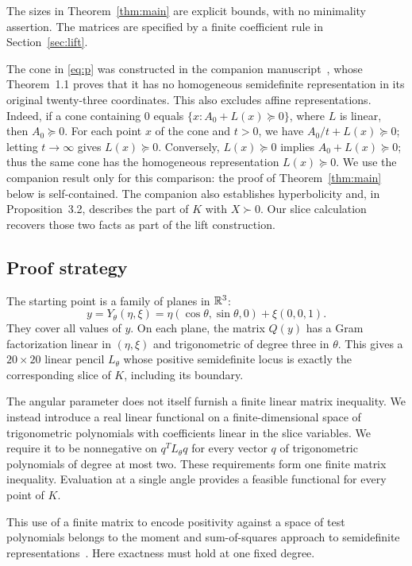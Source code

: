 The sizes in Theorem~\ref{thm:main} are explicit bounds, with no
minimality assertion. The matrices are specified by a finite
coefficient rule in Section~\ref{sec:lift}.

The cone in \eqref{eq:p} was constructed in the companion
manuscript~\cite{parent}, whose Theorem~1.1 proves that it has no
homogeneous semidefinite representation in its original twenty-three
coordinates. This also excludes affine representations. Indeed, if a
cone containing $0$ equals $\{x:A_0+L(x)\succeq0\}$, where $L$ is
linear, then $A_0\succeq0$. For each point $x$ of the cone and $t>0$,
we have $A_0/t+L(x)\succeq0$; letting $t\to\infty$ gives $L(x)\succeq0$.
Conversely, $L(x)\succeq0$ implies $A_0+L(x)\succeq0$; thus the same
cone has the homogeneous representation $L(x)\succeq0$.
We use the companion result only for this comparison: the proof of
Theorem~\ref{thm:main} below is self-contained. The companion also
establishes hyperbolicity and, in Proposition~3.2, describes the part of
$K$ with $X\succ0$. Our slice calculation recovers those two facts as
part of the lift construction.

\subsection{Proof strategy}
The starting point is a family of planes in $\mathbb R^3$:
\[
 y=Y_\theta(\eta,\xi)
   =\eta(\cos\theta,\sin\theta,0)+\xi(0,0,1).
\]
They cover all values of $y$. On each plane, the matrix $Q(y)$ has a
Gram factorization linear in $(\eta,\xi)$ and trigonometric of degree
three in $\theta$. This gives a $20\times20$ linear pencil $L_\theta$
whose positive semidefinite locus is exactly the corresponding slice
of $K$, including its boundary.

The angular parameter does not itself furnish a finite linear matrix
inequality. We instead introduce a real linear functional on a
finite-dimensional space of trigonometric polynomials with coefficients
linear in the slice variables. We require it to be nonnegative on
$q^TL_\theta q$ for every vector $q$ of trigonometric polynomials of
degree at most two. These requirements form one finite matrix
inequality. Evaluation at a single angle provides a feasible functional
for every point of $K$.

This use of a finite matrix to encode positivity against a space of
test polynomials belongs to the moment and sum-of-squares approach to
semidefinite representations~\cite{lasserre2001,lasserre2009}.
Here exactness must hold at one fixed degree.

